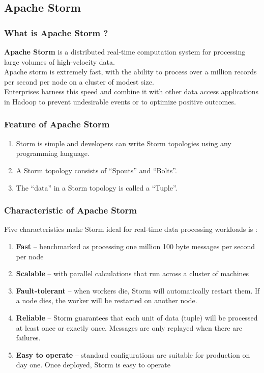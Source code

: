 \documentclass{hcmutarticle}
\begin{document}
\subsection{Apache Storm}
\subsubsection{What is Apache Storm ?\\}
\textbf{Apache Storm} is a distributed real-time computation
system for processing large volumes of high-velocity data.\\
Apache storm is extremely fast, with the ability to process over
a million records per second per node on a cluster of modest
size.\\
Enterprises harness this speed and combine it with other data
access applications in Hadoop to prevent undesirable events or
to optimize positive outcomes.\\
\subsubsection{Feature of Apache Storm}
\begin{enumerate}
\item Storm is simple and developers can write Storm topologies
using any programming language.
\item A Storm topology consists of “Spouts” and “Bolts”.
\item The “data” in a Storm topology is called a “Tuple”.
\end{enumerate}

\subsubsection{Characteristic of Apache Storm\\}
Five characteristics make Storm ideal for real-time data
processing workloads is :
\begin{enumerate}
\item \textbf{Fast} – benchmarked as processing one million 100
byte messages per second per node
\item \textbf{Scalable} – with parallel calculations that run
across a cluster of machines
\item \textbf{Fault-tolerant} – when workers die, Storm will
automatically restart them. If a node dies, the worker will be
restarted on another node.
\item \textbf{Reliable} – Storm guarantees that each unit of
data (tuple) will be processed at least once or exactly once.
Messages are only replayed when there are failures.
\item \textbf{Easy to operate} – standard configurations are
suitable for production on day one. Once deployed, Storm is easy
to operate
\end{enumerate}
\end{document}
